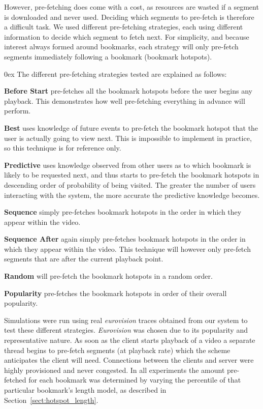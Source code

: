 \documentclass[a4paper,11pt]{article}
\begin{document}
However, pre-fetching does come with a cost, as resources are wasted if a segment is downloaded and never used. Deciding which segments to pre-fetch is therefore a difficult task. We used different pre-fetching strategies, each using different information to decide which segment to fetch next. For simplicity, and because interest always formed around bookmarks, each strategy will only pre-fetch segments immediately following a bookmark (bookmark hotspots). %
{\parindent0ex
The different pre-fetching strategies tested are explained as follows:

    \textbf{Before Start} pre-fetches all the bookmark hotspots before the user begins any playback. This demonstrates how well pre-fetching everything in advance will perform.

    \textbf{Best} uses knowledge of future events to pre-fetch the bookmark hotspot that the user is actually going to view next. This is impossible to implement in practice, so this technique is for reference only. %

    \textbf{Predictive} uses knowledge observed from other users as to which bookmark is likely to be requested next, and thus starts to pre-fetch the bookmark hotspots in descending order of probability of being visited. The greater the number of users interacting with the system, the more accurate the predictive knowledge becomes.

    \textbf{Sequence} simply pre-fetches bookmark hotspots in the order in which they appear within the video.

    \textbf{Sequence After} again simply pre-fetches bookmark hotspots in the order in which they appear within the video. This technique will however only pre-fetch segments that are after the current playback point.

    \textbf{Random} will pre-fetch the bookmark hotspots in a random order.

    \textbf{Popularity} pre-fetches the bookmark hotspots in order of their overall popularity.

}

Simulations were run using real \emph{eurovision} traces obtained from our system to test these different strategies. \emph{Eurovision} was chosen due to its popularity and  representative nature. As soon as the client starts playback of a video a separate thread begins to pre-fetch segments (at playback rate) which the scheme anticipates the client will need. Connections between the clients and server were highly provisioned and never congested. In all experiments the amount pre-fetched for each bookmark was determined by varying the percentile of that particular bookmark's length model, as described in Section~\ref{sect:hotspot_length}.
\end{document}
